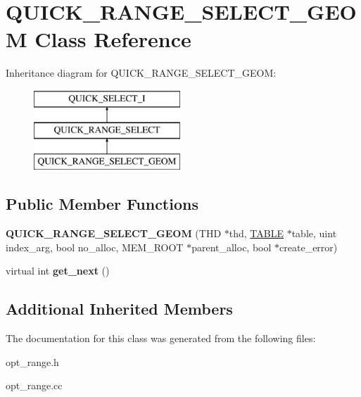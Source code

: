 \hypertarget{classQUICK__RANGE__SELECT__GEOM}{}\section{Q\+U\+I\+C\+K\+\_\+\+R\+A\+N\+G\+E\+\_\+\+S\+E\+L\+E\+C\+T\+\_\+\+G\+E\+OM Class Reference}
\label{classQUICK__RANGE__SELECT__GEOM}
Inheritance diagram for Q\+U\+I\+C\+K\+\_\+\+R\+A\+N\+G\+E\+\_\+\+S\+E\+L\+E\+C\+T\+\_\+\+G\+E\+OM\+:\begin{figure}[H]
\begin{center}
\leavevmode
\includegraphics[height=3.000000cm]{classQUICK__RANGE__SELECT__GEOM}
\end{center}
\end{figure}
\subsection*{Public Member Functions}
\begin{DoxyCompactItemize}
\item 
\mbox{\label{classQUICK__RANGE__SELECT__GEOM_a829653028458c137e737a77036cdb8d6}} 
{\bfseries Q\+U\+I\+C\+K\+\_\+\+R\+A\+N\+G\+E\+\_\+\+S\+E\+L\+E\+C\+T\+\_\+\+G\+E\+OM} (T\+HD $\ast$thd, \mbox{\hyperlink{structTABLE}{T\+A\+B\+LE}} $\ast$table, uint index\+\_\+arg, bool no\+\_\+alloc, M\+E\+M\+\_\+\+R\+O\+OT $\ast$parent\+\_\+alloc, bool $\ast$create\+\_\+error)
\item 
\mbox{\label{classQUICK__RANGE__SELECT__GEOM_a753f6766b0a7c504641c6ffe968921fa}} 
virtual int {\bfseries get\+\_\+next} ()
\end{DoxyCompactItemize}
\subsection*{Additional Inherited Members}


The documentation for this class was generated from the following files\+:\begin{DoxyCompactItemize}
\item 
opt\+\_\+range.\+h\item 
opt\+\_\+range.\+cc\end{DoxyCompactItemize}

